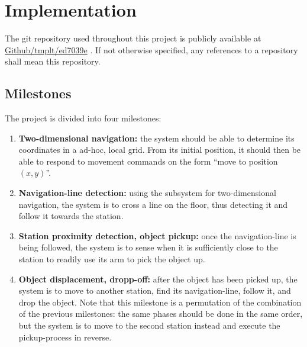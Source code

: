 \section{Implementation}
The git repository used throughout this project is publicly available at \href{https://github.com/tmplt/ed7039e}{Github/tmplt/ed7039e} \parencite{repo}.
If not otherwise specified, any references to a repository shall mean this repository.


\subsection{Milestones}
The project is divided into four milestones:
\begin{enumerate}
\item \textbf{Two-dimensional navigation:}
  the system should be able to determine its coordinates in a ad-hoc, local grid.
  From its initial position, it should then be able to respond to movement commands on the form ``move to position $(x, y)$''.

\item \textbf{Navigation-line detection:}
  using the subsystem for two-dimensional navigation, the system is to cross a line on the floor,
  thus detecting it and follow it towards the station.

\item \textbf{Station proximity detection, object pickup:}
  once the navigation-line is being followed, the system is to sense when it is sufficiently close to the station to readily use its arm to pick the object up.

\item \textbf{Object displacement, dropp-off:}
  after the object has been picked up, the system is to move to another station, find its navigation-line, follow it, and drop the object.
  Note that this milestone is a permutation of the combination of the previous milestones: the same phases should be done in the same order,
  but the system is to move to the second station instead and execute the pickup-process in reverse.
\end{enumerate}

